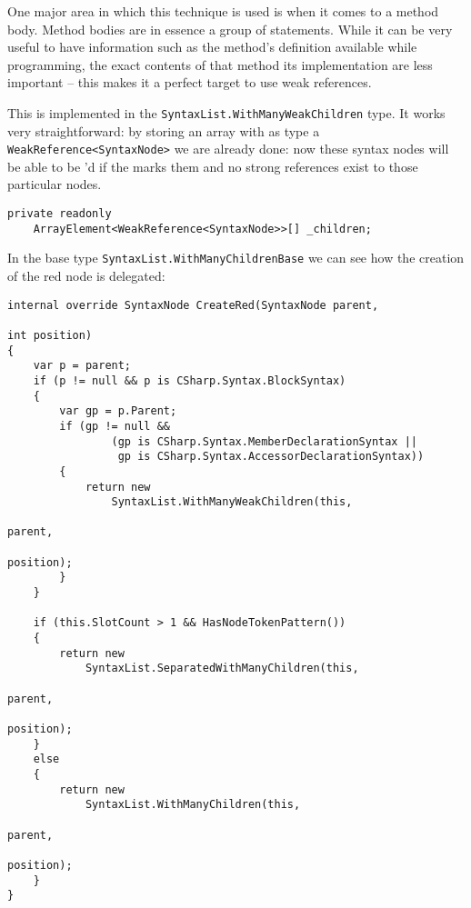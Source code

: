 One major area in which this technique is used is when it comes to a method body. Method bodies are in essence a group of statements. While it can be very useful to have information such as the method's definition available while programming, the exact contents of that method its implementation are less important -- this makes it a perfect target to use weak references.

This is implemented in the \texttt{SyntaxList.WithManyWeakChildren} type. It works very straightforward: by storing an array with as type a \texttt{WeakReference<SyntaxNode>} we are already done: now these syntax nodes will be able to be 'd if the  marks them and no strong references exist to those particular nodes.

\begin{lstlisting}
private readonly 
	ArrayElement<WeakReference<SyntaxNode>>[] _children;
\end{lstlisting}

\noindent In the base type \texttt{SyntaxList.WithManyChildrenBase} we can see how the creation of the red node is delegated:

\begin{lstlisting}
internal override SyntaxNode CreateRed(SyntaxNode parent, 
																			 int position)
{
	var p = parent;
	if (p != null && p is CSharp.Syntax.BlockSyntax)
	{
		var gp = p.Parent;
		if (gp != null && 
				(gp is CSharp.Syntax.MemberDeclarationSyntax || 
				 gp is CSharp.Syntax.AccessorDeclarationSyntax))
		{
			return new 
				SyntaxList.WithManyWeakChildren(this, 
																				parent, 
																				position);
		}
	}

	if (this.SlotCount > 1 && HasNodeTokenPattern())
	{
		return new 
			SyntaxList.SeparatedWithManyChildren(this, 
																					 parent, 
																					 position);
	}
	else
	{
		return new 
			SyntaxList.WithManyChildren(this, 
																	parent, 
																	position);
	}
}
\end{lstlisting}
